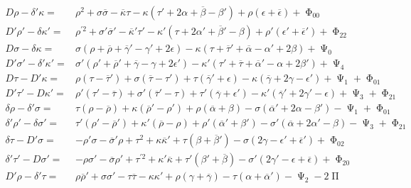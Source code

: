 {\small\begin{align*}
		D\rho -\delta '\kappa = & \rho ^{2} +\sigma \overline{\sigma } -\overline{\kappa } \tau -\kappa ( \tau '+2\alpha +\overline{\beta } -\beta ') +\rho (\epsilon +\overline{\epsilon } )+\upPhi _{00}\\
		D'\rho '-\delta \kappa '= & \rho ^{\prime 2} +\sigma '\overline{\sigma } '-\overline{\kappa } '\tau '-\kappa '( \tau +2\alpha '+\overline{\beta } '-\beta ) +\rho '( \epsilon '+\overline{\epsilon } ') +\upPhi _{22}\\
		D\sigma -\delta \kappa = & \sigma ( \rho +\overline{\rho } +\overline{\gamma } '-\gamma '+2\epsilon ) -\kappa ( \tau +\overline{\tau } '+\overline{\alpha } -\alpha '+2\beta ) +\upPsi _{0}\\
		D'\sigma '-\delta '\kappa '= & \sigma '( \rho '+\overline{\rho } '+\overline{\gamma } -\gamma +2\epsilon ') -\kappa '( \tau '+\overline{\tau } +\overline{\alpha } '-\alpha +2\beta ') +\upPsi _{4}\\
		D\tau -D'\kappa = & \rho ( \tau -\overline{\tau } ') +\sigma (\overline{\tau } -\tau ') +\tau (\overline{\gamma } '+\epsilon ) -\kappa (\overline{\gamma } +2\gamma -\epsilon ') +\upPsi _{1} +\upPhi _{01}\\
		D'\tau '-D\kappa '= & \rho '( \tau '-\overline{\tau }) +\sigma '(\overline{\tau } '-\tau ) +\tau '(\overline{\gamma } +\epsilon ') -\kappa '(\overline{\gamma } '+2\gamma '-\epsilon ) +\upPsi _{3} +\upPhi _{21}\\
		\delta \rho -\delta '\sigma = & \tau (\rho -\overline{\rho } )+\kappa (\overline{\rho } '-\rho ') +\rho (\overline{\alpha } +\beta )-\sigma (\overline{\alpha } '+2\alpha -\beta ') -\upPsi _{1} +\upPhi _{01}\\
		\delta '\rho '-\delta \sigma '= & \tau '( \rho '-\overline{\rho } ') +\kappa '(\overline{\rho } -\rho )+\rho '(\overline{\alpha } '+\beta ') -\sigma '(\overline{\alpha } +2\alpha '-\beta ) -\upPsi _{3} +\upPhi _{21}\\
		\delta \tau -D'\sigma = & -\rho '\sigma -\overline{\sigma } '\rho +\tau ^{2} +\kappa \overline{\kappa } '+\tau ( \beta +\overline{\beta } ') -\sigma ( 2\gamma -\epsilon '+\overline{\epsilon } ') +\upPhi _{02}\\
		\delta '\tau '-D\sigma '= & -\rho \sigma '-\overline{\sigma } \rho '+\tau ^{\prime 2} +\kappa '\overline{\kappa } +\tau '( \beta '+\overline{\beta }) -\sigma '( 2\gamma '-\epsilon +\overline{\epsilon }) +\upPhi _{20}\\
		D'\rho -\delta '\tau = & \rho \overline{\rho } '+\sigma \sigma '-\tau \overline{\tau } -\kappa \kappa '+\rho (\gamma +\overline{\gamma } )-\tau ( \alpha +\overline{\alpha } ') -\upPsi _{2} -2\upPi \\

\end{align*}}
